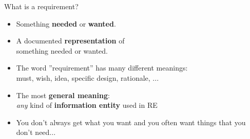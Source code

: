
\begin{Slide}{What is a requirement?}

\begin{itemize}
\item Something \textbf{needed} or \textbf{wanted}.

\item A documented \textbf{representation} of\\something needed or wanted.
\item The word ''requirement'' has many different meanings:\\
  must, wish, idea, specific design, rationale, ...

\item The most \textbf{general meaning}:\\
  \textit{any} kind of \textbf{information entity} used in RE

\item You don't always get what you want and you often want things that you don't need...

\end{itemize}
\end{Slide}